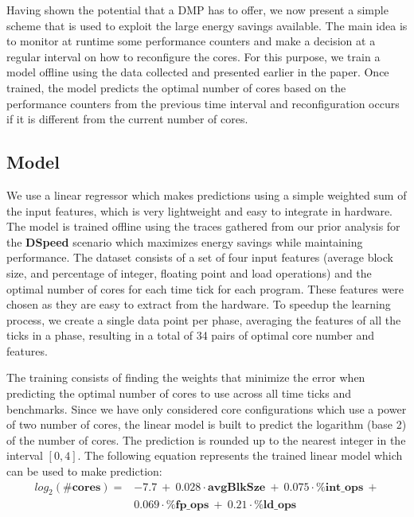 Having shown the potential that a DMP has to offer, we now present a simple scheme that is used to exploit the large energy savings available.
The main idea is to monitor at runtime some performance counters and make a decision at a regular interval on how to reconfigure the cores.
For this purpose, we train a model offline using the data collected and presented earlier in the paper.
Once trained, the model predicts the optimal number of cores based on the performance counters from the previous time interval and reconfiguration occurs if it is different from the current number of cores.

\vspace{10mm}
\subsection{Model}

We use a linear regressor which makes predictions using a simple weighted sum of the input features, which is very lightweight and easy to integrate in hardware.
The model is trained offline using the traces gathered from our prior analysis for the \textbf{DSpeed} scenario which maximizes energy savings while maintaining performance.
The dataset consists of a set of four input features (average block size, and percentage of integer, floating point and load operations) and the optimal number of cores for each time tick for each program.
These features were chosen as they are easy to extract from the hardware.
To speedup the learning process, we create a single data point per phase, averaging the features of all the ticks in a phase, resulting in a total of 34 pairs of optimal core number and features.

The training consists of finding the weights that minimize the error when predicting the optimal number of cores to use across all time ticks and benchmarks.
Since we have only considered core configurations which use a power of two number of cores, the linear model is built to predict the logarithm (base 2) of the number of cores.
The prediction is rounded up to the nearest integer in the interval $[0,4]$.
The following equation represents the trained linear model which can be used to make prediction:
\vspace{-1mm}
\begin{align*}
  log_2(\textbf{\#cores}) = & -7.7\ +\ 0.028 \cdot \textbf{avgBlkSze}\ +\ 0.075 \cdot \textbf{\%int\_ops}\ +\\
 &0.069 \cdot \textbf{\%fp\_ops}\ +\ 0.21 \cdot \textbf{\%ld\_ops}
\end{align*}

